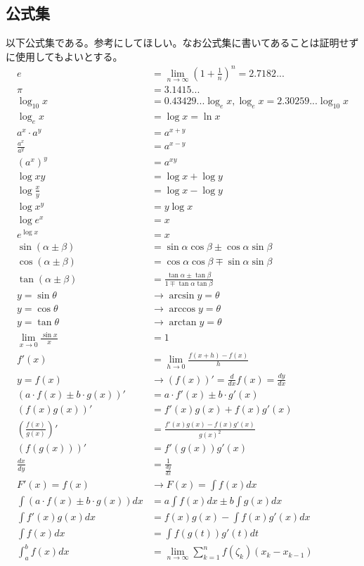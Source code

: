 \documentclass[a4j,dvipdfmx]{jsarticle}
\begin{document}
\subsection*{公式集}
以下公式集である。参考にしてほしい。なお公式集に書いてあることは証明せずに使用してもよいとする。
\begin{align}
    e&=\lim_{n\to\infty}(1+\frac{1}{n})^n=2.7182...\\
    \pi&=3.1415...\\
    \log_{10}x&=0.43429...\log_ex,\log_ex=2.30259...\log_{10}x\\
    \log_ex&=\log x=\ln x\\
    a^x\cdot a^y&=a^{x+y}\\
    \frac{a^x}{a^y}&=a^{x-y}\\
    (a^x)^y&=a^{xy}\\
    \log xy&=\log x+\log y\\
    \log\frac{x}{y}&=\log x - \log y\\
    \log x^y&=y\log x\\
    \log e^x &= x\\
    e^{\log x}&=x\\
    \sin(\alpha\pm\beta)&=\sin\alpha\cos\beta\pm\cos\alpha\sin\beta\\
    \cos(\alpha\pm\beta)&=\cos\alpha\cos\beta\mp\sin\alpha\sin\beta\\
    \tan(\alpha\pm\beta)&=\frac{\tan\alpha\pm\tan\beta}{1\mp\tan\alpha\tan\beta}\\
    y=\sin \theta&\to\arcsin y=\theta\\
    y=\cos \theta&\to\arccos y=\theta\\
    y=\tan \theta&\to\arctan y=\theta\\
    \lim_{x\to0}\frac{\sin x}{x}&=1\\
    f'(x)&=\lim_{h\to0}\frac{f(x+h)-f(x)}{h}\\
    y=f(x)&\to(f(x))'=\frac{d}{dx}f(x)=\frac{dy}{dx}\\
    (a\cdot f(x)\pm b\cdot g(x))'&=a\cdot f'(x)\pm b\cdot g'(x)\\
    (f(x)g(x))'&=f'(x)g(x)+f(x)g'(x)\\
    (\frac{f(x)}{g(x)})'&=\frac{f'(x)g(x)-f(x)g'(x)}{g(x)^2}\\
    (f(g(x)))'&=f'(g(x))g'(x)\\
    \frac{dx}{dy}&=\frac{1}{\frac{dy}{dx}}\\ 
    F'(x)=f(x)&\to F(x)=\int f(x)dx\\
    \int(a\cdot f(x)\pm b\cdot g(x))dx&=a \int f(x)dx\pm b\int g(x)dx\\
    \int f'(x)g(x)dx &= f(x)g(x)-\int f(x)g'(x)dx\\
    \int f(x)dx &= \int f(g(t))g'(t)dt\\
    \int_a^b f(x)dx &=\lim_{n\to\infty}\sum_{k=1}^n f(\zeta_k)(x_k-x_{k-1})
\end{align}
\end{document}
